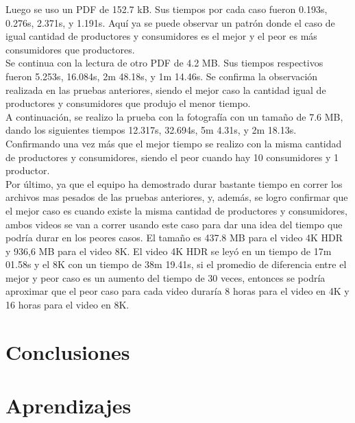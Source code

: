 \documentclass[10pt, article, natbib]{IEEEtran}
\begin{document}
Luego se uso un PDF de 152.7 kB. Sus tiempos por cada caso fueron 0.193s, 0.276s, 2.371s, y 1.191s. Aquí ya se puede observar un patrón donde el caso de igual cantidad de productores y consumidores es el mejor y el peor es más consumidores que productores.\\

Se continua con la lectura de otro PDF de 4.2 MB. Sus tiempos respectivos fueron 5.253s, 16.084s, 2m 48.18s, y 1m 14.46s. Se confirma la observación realizada en las pruebas anteriores, siendo el mejor caso la cantidad igual de productores y consumidores que produjo el menor tiempo.\\

A continuación, se realizo la prueba con la fotografía con un tamaño de 7.6 MB, dando los siguientes tiempos 12.317s, 32.694s, 5m 4.31s, y 2m 18.13s. Confirmando una vez más que el mejor tiempo se realizo con la misma cantidad de productores y consumidores, siendo el peor cuando hay 10 consumidores y 1 productor.\\

Por último, ya que el equipo ha demostrado durar bastante tiempo en correr los archivos mas pesados de las pruebas anteriores, y, además, se logro confirmar que el mejor caso es cuando existe la misma cantidad de productores y consumidores, ambos videos se van a correr usando este caso para dar una idea del tiempo que podría durar en los peores casos. El tamaño es 437.8 MB para el video 4K HDR y 936,6 MB para el video 8K. El video 4K HDR se leyó en un tiempo de 17m 01.58s y el 8K con un tiempo de 38m 19.41s, si el promedio de diferencia entre el mejor y peor caso es un aumento del tiempo de 30 veces, entonces se podría aproximar que el peor caso para cada video duraría 8 horas para el video en 4K y 16 horas para el video en 8K.\\

\section{Conclusiones}

\section{Aprendizajes}

\newpage
\onecolumn
 

\end{document}
